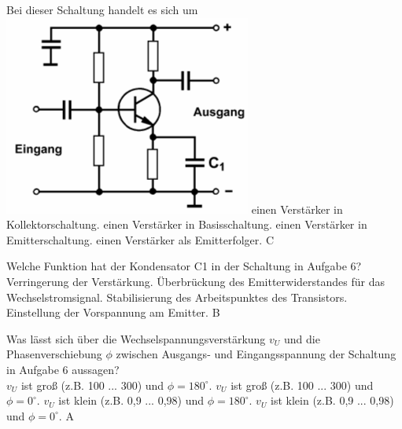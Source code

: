 {Bei dieser Schaltung handelt es sich um\\
\includegraphics[scale=0.4]{Transistor/Bilder/TD403.png}
}%
{einen Verstärker in Kollektorschaltung.}%
{einen Verstärker in Basisschaltung.}%
{einen Verstärker in Emitterschaltung.}%
{einen Verstärker als Emitterfolger.}%
{C}%

{Welche Funktion hat der Kondensator C1 in der  Schaltung in Aufgabe 6?\\
}%
{Verringerung der Verstärkung.}%
{Überbrückung des Emitterwiderstandes für das Wechselstromsignal.}%
{Stabilisierung des Arbeitspunktes des Transistors.}%
{Einstellung der Vorspannung am Emitter.}%
{B}%

{Was lässt sich über die Wechselspannungsverstärkung $v_U$ und die Phasenverschiebung $\phi$ zwischen Ausgangs- und Eingangsspannung der Schaltung in Aufgabe 6 aussagen?\\
}%
{$v_U$ ist groß (z.B. 100 ... 300) und $\phi=180^\circ$.}%
{$v_U$ ist groß (z.B. 100 ... 300) und $\phi=0^\circ$.}%
{$v_U$ ist klein (z.B. 0,9 ... 0,98) und $\phi=180^\circ$.}%
{$v_U$ ist klein (z.B. 0,9 ... 0,98) und $\phi=0^\circ$.}%
{A}%
